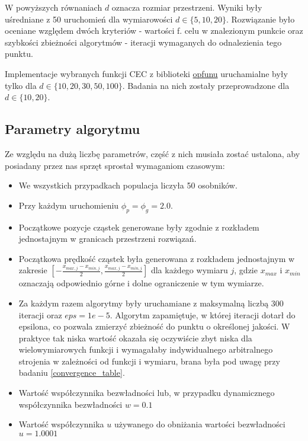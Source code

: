 \documentclass[12pt]{article}
\begin{document}
W powyższych równaniach \(d\) oznacza rozmiar przestrzeni. Wyniki były uśredniane z 50 uruchomień dla wymiarowości \(d \in \{5, 10, 20\}\).
Rozwiązanie było oceniane względem dwóch kryteriów - wartości f. celu w znalezionym punkcie oraz szybkości
zbieżności algorytmów - iteracji wymaganych do odnalezienia tego punktu.

Implementacje wybranych funkcji CEC z biblioteki \href{https://github.com/thieu1995/opfunu}{opfunu} uruchamialne
były tylko dla $d \in \{ 10, 20, 30, 50, 100 \}$. Badania na nich zostały przeprowadzone dla $d \in \{ 10, 20 \}$.

\subsection{Parametry algorytmu}
Ze względu na dużą liczbę parametrów, część z nich musiała zostać ustalona, aby posiadany przez nas sprzęt sprostał wymaganiom czasowym:

\begin{itemize}
	\item We wszystkich przypadkach populacja liczyła 50 osobników.
	\item Przy każdym uruchomieniu $\phi_p = \phi_g = 2.0$.
	\item Początkowe pozycje cząstek generowane były zgodnie z rozkładem jednostajnym w granicach przestrzeni rozwiązań.
	\item Początkowa prędkość cząstek była generowana z rozkładem jednostajnym w zakresie $[-\frac{x_{max, j}-x_{min, j}}{2}, \frac{x_{max, j}-x_{min, j}}{2}]$ dla każdego wymiaru \(j\), gdzie $x_{max}$ i $x_{min}$ oznaczają odpowiednio
	      górne i dolne ograniczenie w tym wymiarze.
	\item Za każdym razem algorytmy były uruchamiane z maksymalną liczbą 300 iteracji oraz $eps = 1e-5$. Algorytm zapamiętuje,
	      w której iteracji dotarł do epsilona, co pozwala zmierzyć zbieżność do punktu o określonej jakości. W praktyce tak niska
	      wartość okazała się oczywiście zbyt niska dla wielowymiarowych funkcji i wymagałaby indywidualnego arbitralnego strojenia
	      w zależności od funkcji i wymiaru, brana była pod uwagę przy badaniu \ref{convergence_table}.
	\item Wartość współczynnika bezwładności lub, w przypadku dynamicznego współczynnika bezwładności $w = 0.1$
	\item Wartość współczynnika $u$ używanego do obniżania wartości bezwładności $u = 1.0001$
\end{itemize}
\end{document}
